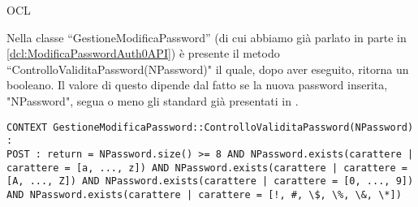 \begin{listaPersonale}{OCL}
    \begin{center}
        
    \end{center}
    Nella classe “GestioneModificaPassword” (di cui abbiamo già parlato in parte in \ref{dcl:ModificaPasswordAuth0API}) è presente il metodo\\ “ControlloValiditaPassword(NPassword)" il quale, dopo aver eseguito, ritorna un booleano. Il valore di questo dipende dal fatto se la nuova password inserita, "NPassword", segua o meno gli standard già presentati in .
    \begin{lstlisting}
CONTEXT GestioneModificaPassword::ControlloValiditaPassword(NPassword) :
POST : return = NPassword.size() >= 8 AND NPassword.exists(carattere | carattere = [a, ..., z]) AND NPassword.exists(carattere | carattere = [A, ..., Z]) AND NPassword.exists(carattere | carattere = [0, ..., 9]) AND NPassword.exists(carattere | carattere = [!, #, \$, \%, \&, \*])
    \end{lstlisting}
    \newpage


\end{listaPersonale}
